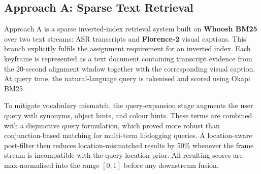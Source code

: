 \subsection{Approach A: Sparse Text Retrieval}
\label{sec:approach-a}

\begin{table}[t]
\small
\centering
\caption{Overview of the three retrieval approaches.}
\label{tab:approach-overview}
\end{table}

Approach A is a sparse inverted-index retrieval system built on \textbf{Whoosh BM25} over two text streams: ASR transcripts and \textbf{Florence-2} visual captions. This branch explicitly fulfils the assignment requirement for an inverted index. Each keyframe is represented as a text document containing transcript evidence from the 20-second alignment window together with the corresponding visual caption. At query time, the natural-language query is tokenised and scored using Okapi BM25 \cite{robertson2009probabilistic}.

To mitigate vocabulary mismatch, the query-expansion stage augments the user query with synonyms, object hints, and colour hints. These terms are combined with a disjunctive query formulation, which proved more robust than conjunction-based matching for multi-term lifelogging queries. A location-aware post-filter then reduces location-mismatched results by 50\% whenever the frame stream is incompatible with the query location prior. All resulting scores are max-normalised into the range $[0,1]$ before any downstream fusion.

